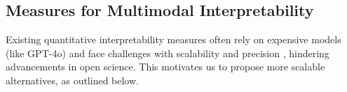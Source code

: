


\subsection{Measures for Multimodal Interpretability}
Existing quantitative interpretability measures \citep{bills2023language} often rely on expensive models (like GPT-4o) and face challenges with scalability and precision \citep{gao2024scaling}, hindering advancements in open science. This motivates us to propose more scalable alternatives, as outlined below.



